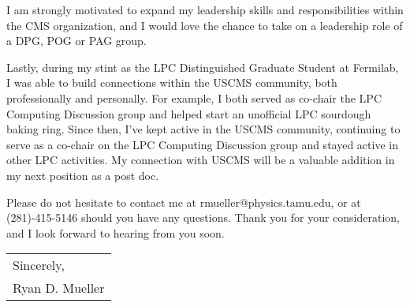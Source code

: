 \documentclass[11pt]{article}
\begin{document}

I am strongly motivated to expand my leadership skills and responsibilities within the CMS organization, and I would love the chance to take on a leadership role of a DPG, POG or PAG group.

Lastly, during my stint as the LPC Distinguished Graduate Student at Fermilab, I was able to build connections within the USCMS community, both professionally and personally. For example, I both served as co-chair the LPC Computing Discussion group and helped start an unofficial LPC sourdough baking ring. Since then, I've kept active in the USCMS community, continuing to serve as a co-chair on the LPC Computing Discussion group and stayed active in other LPC activities. My connection with USCMS will be a valuable addition in my next position as a post doc. 





 Please do not hesitate to contact me at rmueller@physics.tamu.edu, or at (281)-415-5146 should you have any questions. Thank you for your consideration, and I look forward to hearing from you soon.


\bigskip

\begin{tabular}{@{}l@{}}
Sincerely, \\
  [.4em]
  Ryan D. Mueller
\end{tabular}
\end{document}

